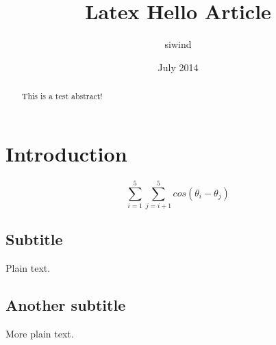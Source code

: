\documentclass[a4paper]{article}
\title{Latex Hello Article}
\author{siwind}
\date{July 2014}
\begin{document}
\maketitle
\tableofcontents

\begin{abstract}
	This is a test abstract!
	
\end{abstract}

\section{Introduction}

$$\sum_{i=1}^{5}\sum_{j=i+1}^{5}cos(\theta_i-\theta_j)$$ 

\subsection{Subtitle}

Plain text.

\subsection{Another subtitle}

More plain text.
\end{document}
